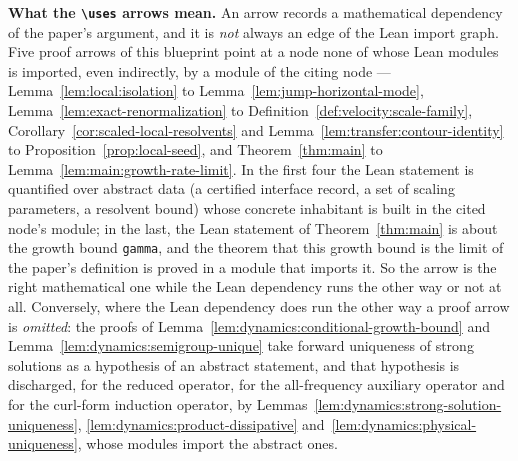 \textbf{What the \texttt{\textbackslash uses} arrows mean.}  An arrow records a mathematical
dependency of the paper's argument, and it is \emph{not} always an edge of the Lean import
graph.  Five proof arrows of this blueprint point at a node none of whose Lean modules is
imported, even indirectly, by a module of the citing node --- Lemma~\ref{lem:local:isolation} to
Lemma~\ref{lem:jump-horizontal-mode}, Lemma~\ref{lem:exact-renormalization} to
Definition~\ref{def:velocity:scale-family},
Corollary~\ref{cor:scaled-local-resolvents} and
Lemma~\ref{lem:transfer:contour-identity} to Proposition~\ref{prop:local-seed}, and
Theorem~\ref{thm:main} to Lemma~\ref{lem:main:growth-rate-limit}.  In the first four the Lean
statement is quantified over abstract data (a certified interface record, a set of scaling
parameters, a resolvent bound) whose concrete inhabitant is built in the cited node's module; in
the last, the Lean statement of Theorem~\ref{thm:main} is about the growth bound
\texttt{gamma}, and the theorem that this growth bound is the limit of the paper's definition is
proved in a module that imports it.  So the arrow is the right mathematical one while the Lean
dependency runs the other way or not at all.  Conversely, where the Lean dependency does run the
other way a proof arrow is \emph{omitted}: the proofs of
Lemma~\ref{lem:dynamics:conditional-growth-bound} and
Lemma~\ref{lem:dynamics:semigroup-unique} take forward uniqueness of strong solutions as a
hypothesis of an abstract statement, and that hypothesis is discharged, for the reduced
operator, for the all-frequency auxiliary operator and for the curl-form induction operator, by
Lemmas~\ref{lem:dynamics:strong-solution-uniqueness}, \ref{lem:dynamics:product-dissipative}
and~\ref{lem:dynamics:physical-uniqueness}, whose modules import the abstract ones.


